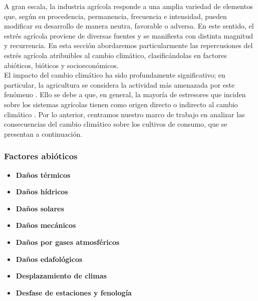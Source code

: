 A gran escala, la industria agrícola responde a una amplia variedad de elementos que, según su procedencia, permanencia, frecuencia e intensidad, pueden modificar su desarrollo de manera neutra, favorable o adversa. En este sentido, el estrés agrícola proviene de diversas fuentes y se manifiesta con distinta magnitud y recurrencia. En esta sección abordaremos particularmente las repercusiones del estrés agrícola atribuibles al cambio climático, clasificándolas en factores abióticos, bióticos y socioeconómicos.\\

El impacto del cambio climático ha sido profundamente significativo; en particular, la agricultura se considera la actividad más amenazada por este fenómeno \cite{Boyer_1982, Raza_2019}. Ello se debe a que, en general, la mayoría de estresores que inciden sobre los sistemas agrícolas tienen como origen directo o indirecto al cambio climático \cite{Olschewski_2024, Raza_2019, Surowka_2020}. Por lo anterior, centramos nuestro marco de trabajo en analizar las consecuencias del cambio climático sobre los cultivos de consumo, que se presentan a continuación.

\subsubsection{Factores abióticos}
\begin{itemize}[leftmargin=0cm, itemsep=0.5 cm]
\item[]\textbf{Daños térmicos\\}
\item[]\textbf{Daños hídricos\\}
\item[]\textbf{Daños solares\\}
\item[]\textbf{Daños mecánicos\\}
\item[]\textbf{Daños por gases atmosféricos\\}
\item[]\textbf{Daños edafológicos\\}
\item[]\textbf{Desplazamiento de climas\\}
\item[]\textbf{Desfase de estaciones y fenología\\}
\end{itemize}

